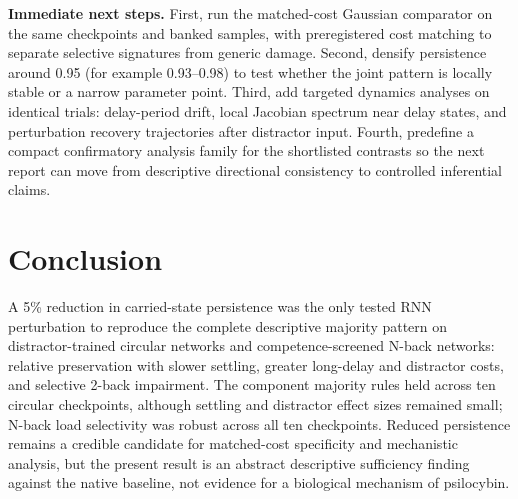 \documentclass[11pt,reprint,aps,prl,floatfix,secnumarabic]{revtex4-2}
\begin{document}
\textbf{Immediate next steps.}
First, run the matched-cost Gaussian comparator on the same checkpoints and
banked samples, with preregistered cost matching to separate selective
signatures from generic damage. Second, densify persistence around 0.95 (for
example 0.93--0.98) to test whether the joint pattern is locally stable or a
narrow parameter point. Third, add targeted dynamics analyses on identical trials:
delay-period drift, local Jacobian spectrum near delay states, and perturbation
recovery trajectories after distractor input. Fourth, predefine a compact
confirmatory analysis family for the shortlisted contrasts so the next report
can move from descriptive directional consistency to controlled inferential
claims.

\section*{Conclusion}

A 5\% reduction in carried-state persistence was the only tested RNN
perturbation to reproduce the complete descriptive majority pattern on
distractor-trained circular networks and competence-screened N-back networks:
relative preservation with slower settling, greater long-delay and distractor
costs, and selective 2-back impairment. The component majority rules held
across ten circular checkpoints, although settling and distractor effect sizes
remained small; N-back load selectivity was robust across all ten checkpoints.
Reduced persistence remains
a credible candidate for matched-cost specificity and mechanistic analysis, but
the present result is an abstract descriptive sufficiency finding against the
native baseline, not evidence for a biological mechanism of psilocybin.



\end{document}
